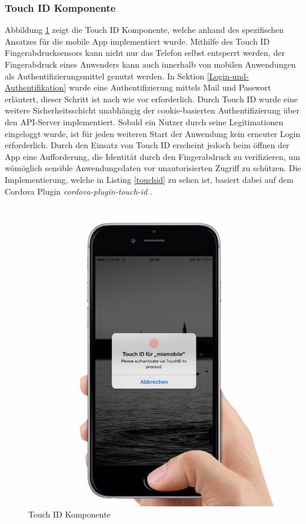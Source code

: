 \subsubsection{Touch ID Komponente}

Abbildung \ref{touchidmock} zeigt die Touch ID Komponente, welche anhand des spezifischen Ansatzes für die mobile App implementiert wurde.
Mithilfe des Touch ID Fingerabdrucksensors kann nicht nur das Telefon selbst entsperrt werden,
der Fingerabdruck eines Anwenders kann auch innerhalb von mobilen Anwendungen als Authentifizierungsmittel genutzt werden.
In Sektion \ref{Login-und-Authentifikation} wurde eine Authentifizierung mittels Mail und Passwort erläutert,
dieser Schritt ist nach wie vor erforderlich. Durch Touch ID wurde eine weitere Sicherheitsschicht unabhängig der cookie-basierten Authentifizierung über den API-Server implementiert.
Sobald ein Nutzer durch seine Legitimationen eingeloggt wurde, ist für jeden weiteren Start der Anwendung kein erneuter Login erforderlich.
Durch den Einsatz von Touch ID erscheint jedoch beim öffnen der App eine Aufforderung, die Identität durch den Fingerabdruck zu verifizieren, um wömöglich sensible Anwendungsdaten vor unautorisierten Zugriff zu schützen.
Die Implementierung, welche in Listing \ref{touchid} zu sehen ist, basiert dabei auf dem Cordova Plugin \emph{cordova-plugin-touch-id} \cite{EddyV87:online}.

\vspace{0.3cm}
\begin{figure}[h!]
 \centering
 \includegraphics[width=0.5\linewidth]{kapitel4/touchid-mock.jpg}
 \caption{Touch ID Komponente}
 \label{touchidmock}
\end{figure}

